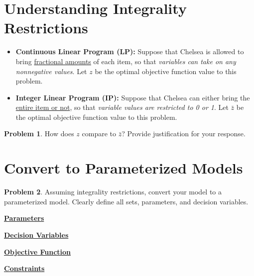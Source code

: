 \documentclass[12pt]{article}
\theoremstyle{definition}
\newtheorem{problem}{Problem}
\begin{document}
\vfill
\newpage

\section{Understanding Integrality Restrictions}
\begin{itemize}
\item \textbf{Continuous Linear Program (LP):}  Suppose that Chelsea is allowed to bring \underline{fractional amounts} of each item, so that \emph{variables can take on any nonnegative values}. Let $z$ be the optimal objective function value to this problem.

\item \textbf{Integer Linear Program (IP):} Suppose that Chelsea can either bring the \underline{entire item or not}, so that \emph{variable values are restricted to  0 or 1}. Let $\bar{z}$ be the optimal objective function value to this problem.
\end{itemize}
\begin{problem} How does $z$ compare to $\bar{z}$? Provide justification for your response. \end{problem}

\vfill

\pagebreak
\section{Convert to Parameterized Models}
\begin{problem}
Assuming integrality restrictions, convert your model to a parameterized model.  Clearly define all sets, parameters, and decision variables. \\
\end{problem}

\textbf{\underline{Parameters}} \vspace{1in}

\textbf{\underline{Decision Variables}} \vspace{1.5in}

\textbf{\underline{Objective Function}} \vspace{1.5in}

\textbf{\underline{Constraints}}



\vskip 15cm
\end{document}
